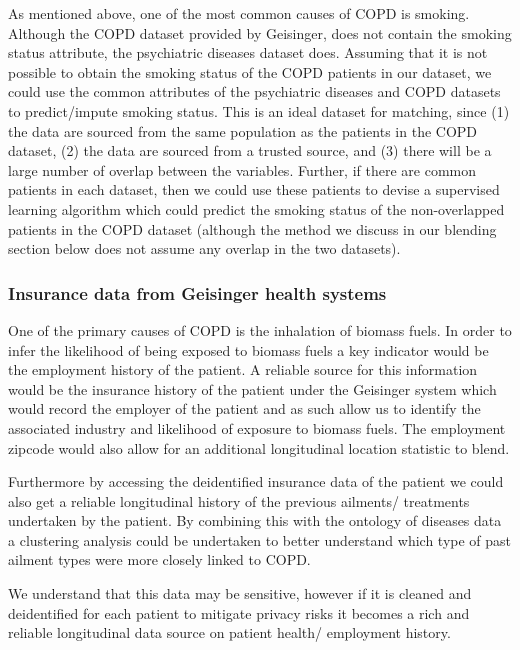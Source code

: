 \documentclass{article}
\begin{document}
As mentioned above, one of the most common causes of COPD is smoking. Although the COPD dataset provided by Geisinger, does not contain the smoking status attribute, the psychiatric diseases dataset does. Assuming that it is not possible to obtain the smoking status of the COPD patients in our dataset, we could use the common attributes of the psychiatric diseases and COPD datasets to predict/impute smoking status. This is an ideal dataset for matching, since (1) the data are sourced from the same population as the patients in the COPD dataset, (2) the data are sourced from a trusted source, and (3) there will be a large number of overlap between the variables. Further, if there are common patients in each dataset, then we could use these patients to devise a supervised learning algorithm which could predict the smoking status of the non-overlapped patients in the COPD dataset (although the method we discuss in our blending section below does not assume any overlap in the two datasets).


\subsubsection{Insurance data from Geisinger health systems}

\noindent One of the primary causes of COPD is the inhalation of biomass fuels. In
order to infer the likelihood of being exposed to biomass fuels a key indicator would be
the employment history of the patient. A reliable source for this information would
be the insurance history of the patient under the Geisinger system which would 
record the employer of the patient and as such allow us to identify the associated 
industry and likelihood of exposure to biomass fuels. The employment zipcode 
would also allow for an additional longitudinal location statistic to blend.\newline

\noindent Furthermore by accessing the deidentified insurance data of the patient 
we could also get a reliable longitudinal history of the previous ailments/ treatments
undertaken by the patient. By combining this with the ontology of diseases data 
a clustering analysis could be undertaken to better understand which type of past ailment
types were more closely linked to COPD.\newline

\noindent We understand that this data may be sensitive, however if it is 
cleaned and deidentified for each patient to mitigate privacy risks it becomes 
a rich and reliable longitudinal data source on patient health/ employment history.
\end{document}
